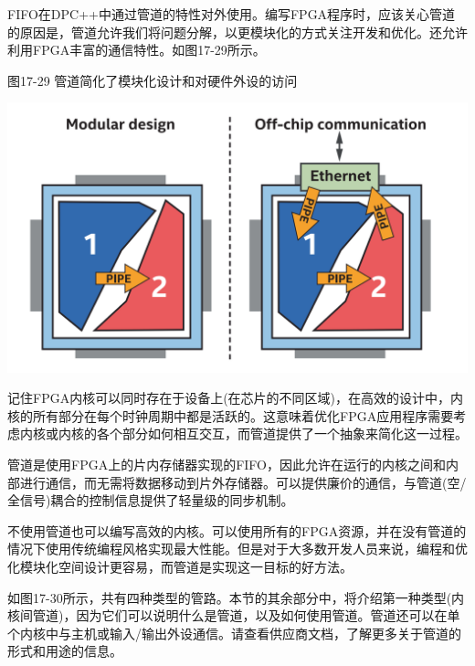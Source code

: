 FIFO在DPC++中通过管道的特性对外使用。编写FPGA程序时，应该关心管道的原因是，管道允许我们将问题分解，以更模块化的方式关注开发和优化。还允许利用FPGA丰富的通信特性。如图17-29所示。\par

\hspace*{\fill} \par %
图17-29 管道简化了模块化设计和对硬件外设的访问
\begin{center}
	\includegraphics[width=1.0\textwidth]{content/chapter-17/images/24}
\end{center}

记住FPGA内核可以同时存在于设备上(在芯片的不同区域)，在高效的设计中，内核的所有部分在每个时钟周期中都是活跃的。这意味着优化FPGA应用程序需要考虑内核或内核的各个部分如何相互交互，而管道提供了一个抽象来简化这一过程。\par

管道是使用FPGA上的片内存储器实现的FIFO，因此允许在运行的内核之间和内部进行通信，而无需将数据移动到片外存储器。可以提供廉价的通信，与管道(空/全信号)耦合的控制信息提供了轻量级的同步机制。\par

\begin{tcolorbox}[colback=blue!5!white,colframe=blue!75!black, title=我们需要管道吗?]
不使用管道也可以编写高效的内核。可以使用所有的FPGA资源，并在没有管道的情况下使用传统编程风格实现最大性能。但是对于大多数开发人员来说，编程和优化模块化空间设计更容易，而管道是实现这一目标的好方法。
\end{tcolorbox}

如图17-30所示，共有四种类型的管路。本节的其余部分中，将介绍第一种类型(内核间管道)，因为它们可以说明什么是管道，以及如何使用管道。管道还可以在单个内核中与主机或输入/输出外设通信。请查看供应商文档，了解更多关于管道的形式和用途的信息。\par

